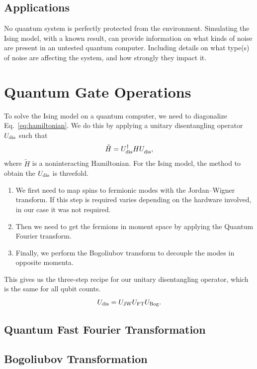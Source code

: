 \documentclass[12pt, twocolumn]{article}
\begin{document}
  \subsection{Applications}

  No quantum system is perfectly protected from the environment. Simulating the Ising model, with a known result, can provide information on what kinds of noise are present in an untested quantum computer. Including details on what type(s) of noise are affecting the system, and how strongly they impact it.

  \section{Quantum Gate Operations}
  To solve the Ising model on a quantum computer, we need to diagonalize Eq.~\eqref{eq:hamiltonian}. We do this by applying a unitary disentangling operator \( U_{\textnormal{dis}} \) such that
  \begin{equation}
    \tilde{H}
      = U_{\textnormal{dis}}^{\dagger} H
        U_{\textnormal{dis}}^{\vphantom{\dagger}},
  \end{equation}
  where \( \tilde{H} \) is a noninteracting Hamiltonian. For the Ising model, the method to obtain the \( U_{\textnormal{dis}} \) is threefold.
  \begin{enumerate}
    \item We first need to map spins to fermionic modes with the Jordan--Wigner transform. If this step is required varies depending on the hardware involved, in our case it was not required.
    \item Then we need to get the fermions in moment space by applying the Quantum Fourier transform.
    \item Finally, we perform the Bogoliubov transform to decouple the modes in opposite momenta.
  \end{enumerate}
  This gives us the three-step recipe for our unitary disentangling operator, which is the same for all qubit counts.
  \begin{equation}
    U_{\textnormal{dis}}
      = U_{\textnormal{JW}} U_{\textnormal{FT}} U_{\textnormal{Bog}}.
  \end{equation}

  \subsection{Quantum Fast Fourier Transformation}

  \subsection{Bogoliubov Transformation}
\end{document}
